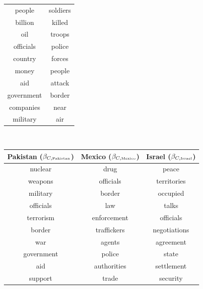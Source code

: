 \begin{table}
\begin{tabular}{|cc|}
  people & soldiers \\
  billion & killed \\
  oil & troops \\
  officials & police \\
  country & forces \\
  money & people \\
  aid & attack \\
  government & border \\
  companies & near \\
  military & air \\
  \hline
\end{tabular}
\\
\vspace{30pt}
\begin{tabular}{|c|c|c|}
  \hline
  \textbf{Pakistan ($\beta_{C,\mbox{\tiny Pakistan}}$)} &
  \textbf{Mexico ($\beta_{C,\mbox{\tiny Mexico}}$)} &
  \textbf{Israel ($\beta_{C,\mbox{\tiny Israel}}$)} \\
  \hline
  nuclear & drug & peace \\
  weapons & officials & territories \\
  military & border & occupied \\
  officials & law & talks \\
  terrorism & enforcement & officials \\
  border & traffickers & negotiations \\
  war & agents & agreement \\
  government & police & state\\
  aid & authorities & settlement \\
  support & trade & security \\
  \hline
\end{tabular}
\vspace{10pt}
\begin{tabular}{|c|c|c|}
  \hline

\end{tabular}
\end{table}
